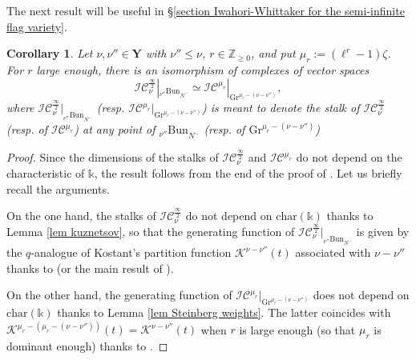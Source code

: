 \documentclass[11pt]{amsart}
\theoremstyle{plain}
\newtheorem{coro}[thm]{Corollary}
\theoremstyle{remark}
\numberwithin{equation}{section}
\begin{document}
 The next result will be useful in §\ref{section Iwahori-Whittaker for the semi-infinite flag variety}.
 \begin{coro}\label{coro kostant}
     Let $\nu,\nu''\in\mathbf{Y}$ with $\nu''\leq \nu$, $r\in\mathbb{Z}_{\geq0}$, and put $\mu_r:=(\ell^r-1)\zeta$. For $r$ large enough, there is an isomorphism of complexes of vector spaces
     $$\mathcal{IC}^{\frac{\infty}{2}}_{\nu}|_{{_{ \nu''}\mathrm{Bun}}_{N^-}} \simeq \mathcal{IC}^{\mu_r}|_{\mathrm{Gr}^{{\mu_r-(\nu-\nu'')}}},$$
     where $\mathcal{IC}^{\frac{\infty}{2}}_{\nu}|_{{_{ \nu''}\mathrm{Bun}}_{N^-}}$ (resp. $\mathcal{IC}^{\mu_r}|_{\mathrm{Gr}^{\mu_r-(\nu-\nu'')}}$) is meant to denote the stalk of $\mathcal{IC}^{\frac{\infty}{2}}_{\nu}$ (resp. of $\mathcal{IC}^{\mu_r}$) at any point of ${_{ \nu''}\mathrm{Bun}}_{N^-}$ (resp. of $\mathrm{Gr}^{\mu_r-(\nu-\nu'')}$)
 \end{coro}
 \begin{proof}
     Since the dimensions of the stalks of $\mathcal{IC}^{\frac{\infty}{2}}_{\nu}$ and $\mathcal{IC}^{\mu_r}$ do not depend on the characteristic of $\mathbb{k}$, the result follows from the end of the proof of \cite[Theorem 5.3.5]{ABBGM}. Let us briefly recall the arguments.

     On the one hand, the stalks of $\mathcal{IC}^{\frac{\infty}{2}}_{\nu}$ do not depend on $\mathrm{char}(\mathbb{k})$ thanks to Lemma \ref{lem kuznetsov}, so that the generating function of $\mathcal{IC}^{\frac{\infty}{2}}_{\nu}|_{{_{ \nu''}\mathrm{Bun}}_{N^-}}$ is given by the $q$-analogue of Kostant's partition function $\mathcal{K}^{\nu-\nu''}(t)$ associated with $\nu-\nu''$ thanks to \cite[§3]{feigin2semi} (or the main result of \cite{kuznetsov1996laumon}).

     On the other hand, the generating function of $\mathcal{IC}^{\mu_r}|_{\mathrm{Gr}^{\mu_r-(\nu-\nu'')}}$ does not depend on $\mathrm{char}(\mathbb{k})$ thanks to Lemma \ref{lem Steinberg weights}. The latter coincides with $\mathcal{K}^{\mu_r-(\mu_r-(\nu-\nu''))}(t)=\mathcal{K}^{\nu-\nu''}(t)$ when $r$ is large enough (so that $\mu_r$ is dominant enough) thanks to \cite[§§9,11]{lusztigsingularities}.
 \end{proof}
\end{document}
